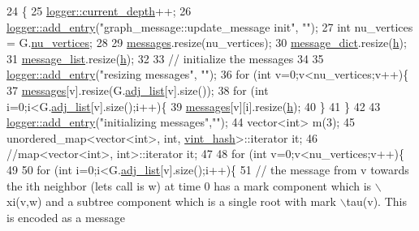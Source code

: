 \begin{DoxyCode}
24 \{
25   \hyperlink{classlogger_a9d29b49bd318a719a8e85b59eac54fe0}{logger::current\_depth}++;
26   \hyperlink{classlogger_a710163deb17bc81f70d53d285b8ac9ac}{logger::add\_entry}(\textcolor{stringliteral}{"graph\_message::update\_message init"}, \textcolor{stringliteral}{""});
27   \textcolor{keywordtype}{int} nu\_vertices = G.\hyperlink{classmarked__graph_acf79c6aeb8f32614cb14a5baaa6c9f9b}{nu\_vertices};
28 
29   \hyperlink{classgraph__message_aac77e098f0acf9650116a8e51fe3b4b7}{messages}.resize(nu\_vertices);
30   \hyperlink{classgraph__message_ab54d89b122c2b1322da0d5db2043fb84}{message\_dict}.resize(\hyperlink{classgraph__message_a934d63ed7275c211e13c6fb68824ed46}{h});
31   \hyperlink{classgraph__message_aa17fdb629b423343edfafa97252763ef}{message\_list}.resize(\hyperlink{classgraph__message_a934d63ed7275c211e13c6fb68824ed46}{h});
32 
33   \textcolor{comment}{// initialize the messages}
34 
35   \hyperlink{classlogger_a710163deb17bc81f70d53d285b8ac9ac}{logger::add\_entry}(\textcolor{stringliteral}{"resizing messages"}, \textcolor{stringliteral}{""});
36   \textcolor{keywordflow}{for} (\textcolor{keywordtype}{int} v=0;v<nu\_vertices;v++)\{
37     \hyperlink{classgraph__message_aac77e098f0acf9650116a8e51fe3b4b7}{messages}[v].resize(G.\hyperlink{classmarked__graph_a1a0bf7ca413a278763f7c878b3b6fd6f}{adj\_list}[v].size());
38     \textcolor{keywordflow}{for} (\textcolor{keywordtype}{int} i=0;i<G.\hyperlink{classmarked__graph_a1a0bf7ca413a278763f7c878b3b6fd6f}{adj\_list}[v].size();i++)\{
39       \hyperlink{classgraph__message_aac77e098f0acf9650116a8e51fe3b4b7}{messages}[v][i].resize(\hyperlink{classgraph__message_a934d63ed7275c211e13c6fb68824ed46}{h});
40     \}
41   \}
42 
43   \hyperlink{classlogger_a710163deb17bc81f70d53d285b8ac9ac}{logger::add\_entry}(\textcolor{stringliteral}{"initializing messages"},\textcolor{stringliteral}{""});
44   vector<int> m(3);
45   unordered\_map<vector<int>, int, \hyperlink{structvint__hash}{vint\_hash}>::iterator it;
46   \textcolor{comment}{//map<vector<int>, int>::iterator it;}
47 
48   \textcolor{keywordflow}{for} (\textcolor{keywordtype}{int} v=0;v<nu\_vertices;v++)\{
49 
50     \textcolor{keywordflow}{for} (\textcolor{keywordtype}{int} i=0;i<G.\hyperlink{classmarked__graph_a1a0bf7ca413a278763f7c878b3b6fd6f}{adj\_list}[v].size();i++)\{
51       \textcolor{comment}{// the message from v towards the ith neighbor (lets call is w) at time 0 has a mark component which
       is \(\backslash\)xi(v,w) and a subtree component which is a single root with mark \(\backslash\)tau(v). This is encoded as a message
}
\end{DoxyCode}
